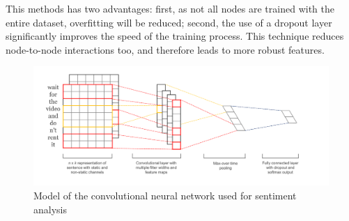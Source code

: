 This methods has two advantages: first, as not all nodes are trained with the entire dataset, overfitting will be reduced; second, the use of a dropout layer significantly improves the speed of the training process. This technique reduces node-to-node interactions too, and therefore leads to more robust features.

\begin{figure}[h!]
\centering
	\includegraphics[scale=0.3]{CNN} 
\caption{Model of the convolutional neural network used for sentiment analysis \cite{cnnYoon}}
\label{plot:CNN}
\end{figure}
\FloatBarrier
\label{sec:methods}
